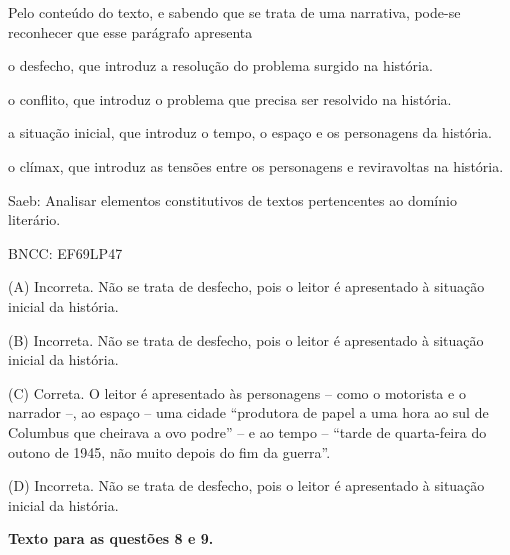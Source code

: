 
Pelo conteúdo do texto, e sabendo que se trata de uma narrativa, pode-se
reconhecer que esse parágrafo apresenta

\begin{escolha}
\item o desfecho, que introduz a resolução do problema surgido na história.

\item o conflito, que introduz o problema que precisa ser resolvido na
história.

\item a situação inicial, que introduz o tempo, o espaço e os personagens
da história.

\item o clímax, que introduz as tensões entre os personagens e reviravoltas
na história.
\end{escolha}

Saeb: Analisar elementos constitutivos de textos pertencentes ao domínio
literário.

BNCC: EF69LP47

(A) Incorreta. Não se trata de desfecho, pois o leitor é apresentado à
situação inicial da história.

(B) Incorreta. Não se trata de desfecho, pois o leitor é apresentado à
situação inicial da história.

(C) Correta. O leitor é apresentado às personagens -- como o motorista e
o narrador --, ao espaço -- uma cidade ``produtora de papel a uma hora
ao sul de Columbus que cheirava a ovo podre'' -- e ao tempo -- ``tarde
de quarta-feira do outono de 1945, não muito depois do fim da guerra''.

(D) Incorreta. Não se trata de desfecho, pois o leitor é apresentado à
situação inicial da história.

\textbf{Texto para as questões 8 e 9.}

